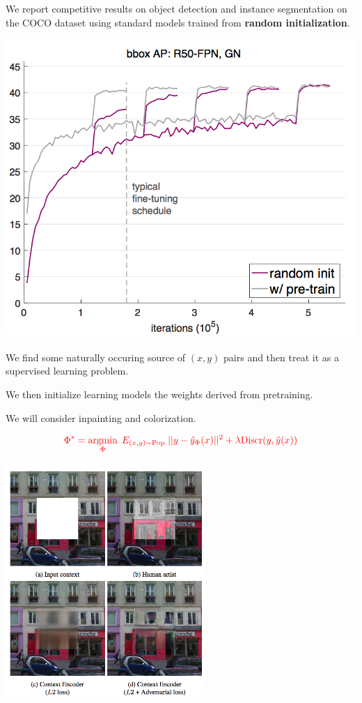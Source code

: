 {

We report competitive results on object detection and instance segmentation on the COCO dataset using standard
models trained from {\bf random initialization}.



\centerline{\includegraphics[width=6.0 in]{../images/RethinkingPre}}


We find some naturally occuring source of $(x,y)$ pairs and then treat it as a supervised learning problem.

\vfill
We then initialize learning models the weights derived from pretraining.

\vfill
We will consider inpainting and colorization.


$${\color{red} \Phi^* = \operatorname*{argmin}_{\Phi}\; E_{(x,y) \sim \mathrm{Pop}}\;||y - \hat{y}_\Phi(x)||^2 + \lambda \mathrm{Discr}(y,\hat{y}(x))}$$

\centerline{\includegraphics[width = 3in]{../images/LearnRepInpa}}

}
